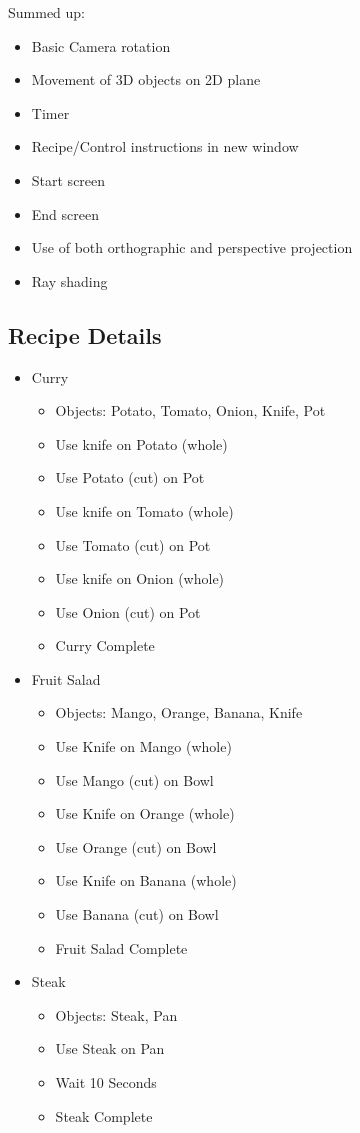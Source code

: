 \documentclass[11pt]{article}
\begin{document}
Summed up:
\begin{itemize}
\item Basic Camera rotation
\item Movement of 3D objects on 2D plane
\item Timer
\item Recipe/Control instructions in new window
\item Start screen
\item End screen
\item Use of both orthographic and perspective projection
\item Ray shading
\end{itemize}

\subsection*{Recipe Details}
\label{sec:orgc125921}

\begin{itemize}
\item Curry
\begin{itemize}
\item Objects: Potato, Tomato, Onion, Knife, Pot
\item Use knife on Potato (whole)
\item Use Potato (cut) on Pot
\item Use knife on Tomato (whole)
\item Use Tomato (cut) on Pot
\item Use knife on Onion (whole)
\item Use Onion (cut) on Pot
\item Curry Complete
\end{itemize}

\item Fruit Salad
\begin{itemize}
\item Objects: Mango, Orange, Banana, Knife
\item Use Knife on Mango (whole)
\item Use Mango (cut) on Bowl
\item Use Knife on Orange (whole)
\item Use Orange (cut) on Bowl
\item Use Knife on Banana (whole)
\item Use Banana (cut) on Bowl
\item Fruit Salad Complete
\end{itemize}

\item Steak
\begin{itemize}
\item Objects: Steak, Pan
\item Use Steak on Pan
\item Wait 10 Seconds
\item Steak Complete
\end{itemize}
\end{itemize}
\end{document}
